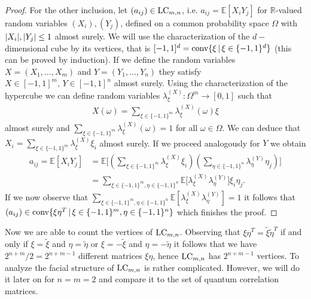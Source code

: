 \begin{proof}
	For the other inclusion, let $ (a_{ij}) \in \textup{LC}_{m,n} $, i.e. $ a_{ij} = \mathbb{E}[X_iY_j] $ for $ \mathbb{R} $-valued random variables $ (X_i),(Y_j) $, defined on a common probability space $ \Omega $ with $ {\left|{X_i}\right|},{\left|{Y_j}\right|} \le 1 $ almost surely. 
	We will use the characterization of the $ d-$dimensional cube by its vertices, that is $ [-1,1]^d = \textup{conv} \{\xi \, | \, \xi \in \{-1,1 \}^d \}$ (this can be proved by induction). 
	If we define the random variables $ X= (X_1,\hdots,X_m) $ and $ Y= (Y_1,\hdots,Y_n) $ they satisfy $ X \in [-1,1]^m, \, Y \in [-1,1]^n $ almost surely. Using the characterization of the hypercube we can define random variables $ \lambda_{\xi}^{(X)}: \Omega^m \to [0,1] $ such that 
	\begin{align*}
		X(\omega) = \sum_{\xi \in \{-1,1\}^m}\lambda_{\xi}^{(X)}(\omega)\xi
	\end{align*} 
	almost surely 
	and $ \sum_{\xi \in \{-1,1\}^m}\lambda_{\xi}^{(X)}(\omega) = 1  $ for all $ \omega \in \Omega $. We can deduce that 
	$X_i =  \sum_{\xi \in \{-1,1\}^m}\lambda_{\xi}^{(X)}\xi_i $ almost surely.
	If we proceed analogously for $ Y $ we obtain
	\begin{align*}
		a_{ij} = \mathbb{E}[X_iY_j] &= \mathbb{E} \big [  (\sum_{\xi \in \{-1,1\}^m}\lambda_{\xi}^{(X)}\xi_i ) (\sum_{\eta \in \{-1,1\}^n}\lambda_{\eta}^{(Y)}\eta_j ) \big ]   \\
		&= \sum_{\xi \in \{-1,1\}^m, \eta \in \{-1,1\}^n} \mathbb{E}\big [\lambda_{\xi}^{(X)}\lambda_{\eta}^{(Y)} \big ] \xi_i \eta_j.
	\end{align*}
	If we now observe that $
		\sum_{\xi \in \{-1,1\}^m, \eta \in \{-1,1\}^n}\mathbb{E} [\lambda_{\xi}^{(X)}\lambda_{\eta}^{(Y)}] = 1 $ it follows that $ (a_{ij}) \in  \textup{conv} \{  \xi\eta^T \, | \, \xi \in \{-1,1\}^m, \eta \in \{-1,1\}^n   \}$
 which finishes the proof.
\end{proof}
\noindent Now we are able to count the vertices of $ \textup{LC}_{m,n} $. Observing that $ \xi \eta^T = \tilde{\xi} \tilde{\eta}^T $ if and only if $ \xi = \tilde{\xi} $ and $ \eta = \tilde{\eta} $ or $ \xi = -\tilde{\xi} $ and $ \eta = -\tilde{\eta} $ it follows that we have $ 2^{n+m}/2 = 2^{n+m-1} $ different matrices $ \xi \eta $, hence $ \textup{LC}_{m,n} $ has $ 2^{n+m-1} $ vertices. To analyze the facial structure of $ \textup{LC}_{m,n} $ is rather complicated. 
However, we will do it later on for $ n=m=2 $ and compare it to the set of quantum correlation matrices. 

